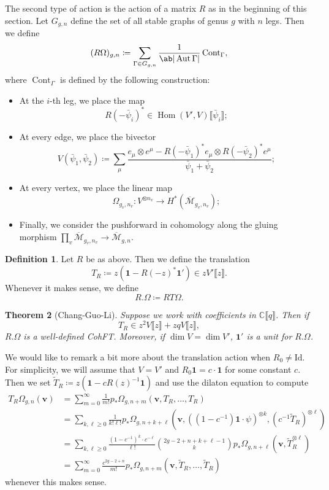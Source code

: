 \documentclass[10pt]{amsart}
\newtheorem{thm}{Theorem}[section]
\theoremstyle{definition}
\newtheorem{defn}[thm]{Definition}
\theoremstyle{remark}
\theoremstyle{plain}
\theoremstyle{definition}
\theoremstyle{remark}
\newcommand{\C}{\mathbb{C}}
\newcommand{\Mbar}{\overline{\mathcal{M}}}
\newcommand{\mbf}[1]{\mathbf{#1}}
\newcommand{\bv}{\mbf{v}}
\newcommand{\mr}[1]{\mathrm{#1}}
\newcommand{\on}[1]{\operatorname{#1}}
\newcommand{\1}{\mathbf{1}}
\newcommand{\2}{\mathbf{2}}
\newcommand{\3}{\mathbf{3}}
\newcommand{\ps}[1]{\llbracket #1 \rrbracket}
\DeclareMathOperator{\Hom}{Hom}
\DeclareMathOperator{\Aut}{Aut}
\begin{document}
The second type of action is the action of a matrix $R$ as in the beginning of this section. Let $G_{g,n}$ define the set of all stable graphs of genus $g$ with $n$ legs. Then we define
\[ (R\Omega)_{g,n} \coloneqq \sum_{\Gamma \in G_{g,n}} \frac{1}{\ab|\Aut \Gamma|} \on{Cont}_{\Gamma}, \]
where $\on{Cont}_{\Gamma}$ is defined by the following construction:
\begin{itemize}
    \item At the $i$-th leg, we place the map 
        \[ R(-\bar{\psi}_i)^* \in \Hom(V',V) \ps{\bar{\psi}_i}; \]
    \item At every edge, we place the bivector
        \[ V(\bar{\psi}_1, \bar{\psi}_2) \coloneqq \sum_{\mu} \frac{e_{\mu} \otimes e^{\mu} - R(-\bar{\psi}_1)^* e_{\mu} \otimes R(-\bar{\psi}_2)^* e^{\mu}}{\bar{\psi}_1 + \bar{\psi}_2}; \]
    \item At every vertex, we place the linear map
        \[ \Omega_{g_v, n_v} \colon V^{\otimes n_v} \to H^*(\Mbar_{g_v, n_v}); \]
    \item Finally, we consider the pushforward in cohomology along the gluing morphism $\prod_v \Mbar_{g_v, n_v} \to \Mbar_{g,n}$.
\end{itemize}

\begin{defn}
    Let $R$ be as above. Then we define the translation
    \[ T_R \coloneqq z (\1 - R(-z)^* \1') \in z V'\ps{z}. \]
    Whenever it makes sense, we define
    \[ R.\Omega \coloneqq RT\Omega. \]
\end{defn}

\begin{thm}[Chang-Guo-Li]
    Suppose we work with coefficients in $\C\ps{q}$. Then if
    \[ T_R \in z^2 V \ps{z} + zq V \ps{z}, \]
    $R.\Omega$ is a well-defined CohFT. Moreover, if $\dim V = \dim V'$, $\1'$ is a unit for $R.\Omega$.
\end{thm}

We would like to remark a bit more about the translation action when $R_0 \neq \mr{Id}$. For simplicity, we will assume that $V = V'$ and $R_0 \1 = c \cdot \1$ for some constant $c$. Then we set $\tilde{T}_R \coloneqq z( \1 - c R(z)^{-1} \1)$ and use the dilaton equation to compute
\begin{align*}
    T_R \Omega_{g,n}(\bv) &= \sum_{m=0}^{\infty} \frac{1}{m!} p_*\Omega_{g,n+m}(\bv, T_R, \ldots, T_R) \\
    &= \sum_{k,\ell \geq 0} \frac{1}{k!\ell!} p_* \Omega_{g,n+k+\ell}(\bv, ( (1-c^{-1})\1 \cdot \psi )^{\otimes k}, ( c^{-1} \tilde{T}_R )^{\otimes \ell}) \\
    &= \sum_{k,\ell \geq 0} \frac{(1-c^{-1})^k \cdot c^{-\ell}}{\ell!} \binom{2g-2+n+k+\ell-1}{k} p_* \Omega_{g,n+\ell}(\bv, \tilde{T}_R^{\otimes \ell}) \\
    &= \sum_{m=0}^{\infty} \frac{c^{2g-2+n}}{m!} p_* \Omega_{g,n+m}(\bv, \tilde{T}_R, \ldots, \tilde{T}_R)
\end{align*}
whenever this makes sense.
\end{document}
